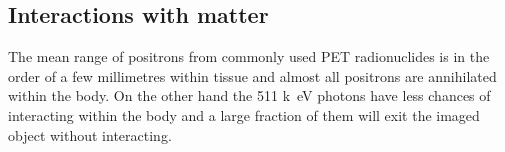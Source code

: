 \begin{table}[htbp]
  \caption{Commonly used radioisotopes and their relevant characteristics for PET imaging.}
\label{tab:radioisotopes}%
\end{table}%

\subsection{Interactions with matter}
The mean range of positrons from commonly used PET radionuclides is in the order of a few millimetres within tissue and almost all positrons are annihilated within the body.
On the other hand the 511 \si{k\electronvolt} photons have less chances of interacting within the body and a large fraction of them will exit the imaged object without interacting. 


